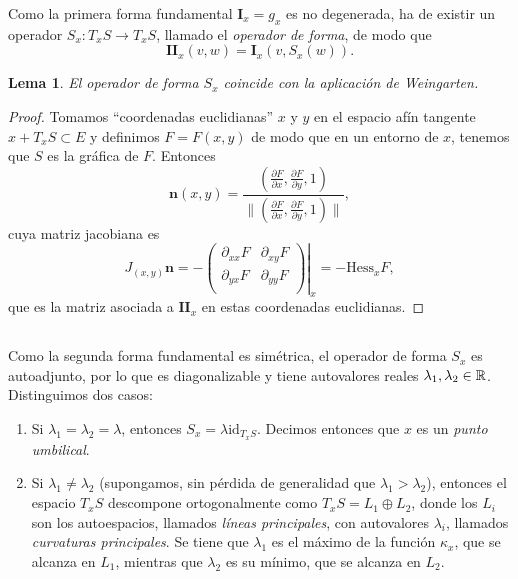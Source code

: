 \documentclass[11pt,a4paper]{amsbook}
\newtheorem{lemma}[subsection]{Lema}
\theoremstyle{remark} \newtheorem{rmk}[subsection]{Observación}
\theoremstyle{definition} \newtheorem{defn}[subsection]{Definición}
\theoremstyle{definition} \newtheorem{ex}[subsection]{Ejemplo}
\theoremstyle{definition} \newtheorem{ej}[subsection]{Ejercicio}
\begin{document}
Como la primera forma fundamental $\mathbf{I}_x=g_x$ es no degenerada, ha de existir un operador $S_x:T_xS \rightarrow T_xS$, llamado el \emph{operador de forma}, de modo que
\begin{equation*}
\mathbf{II}_x(v,w) = \mathbf{I}_x(v,S_x(w)).
\end{equation*}

\begin{lemma}
El operador de forma $S_x$ coincide con la aplicación de Weingarten.
\end{lemma}

\begin{proof}
  Tomamos ``coordenadas euclidianas'' $x$ y $y$ en el espacio afín tangente $x+T_x S \subset E$ y definimos $F=F(x,y)$ de modo que en un entorno de $x$, tenemos que $S$ es la gráfica de $F$. Entonces
  \begin{equation*}
\bm{n}(x,y) = \frac{(\frac{\partial F}{\partial x}, \frac{\partial F}{\partial y}, 1)}{\lVert (\frac{\partial F}{\partial x}, \frac{\partial F}{\partial y}, 1)\rVert},
  \end{equation*}
  cuya matriz jacobiana es
  \begin{equation*}
    J_{(x,y)} \bm{n}=
-\left. \begin{pmatrix}
\partial_{xx} F & \partial_{xy} F \\
\partial_{yx} F & \partial_{yy} F \\
\end{pmatrix} \right|_x = - \mathrm{Hess}_x F,
  \end{equation*}
  que es la matriz asociada a $\mathbf{II}_x$ en estas coordenadas euclidianas.
\end{proof}

\subsection{} Como la segunda forma fundamental es simétrica, el operador de forma $S_x$ es autoadjunto, por lo que es diagonalizable y tiene autovalores reales $\lambda_1,\lambda_2 \in \mathbb R$. Distinguimos dos casos:
\begin{enumerate}
\item Si $\lambda_1=\lambda_2=\lambda$, entonces $S_x = \lambda \mathrm{id}_{T_x S}$. Decimos entonces que $x$ es un \emph{punto umbilical}.
  \item Si $\lambda_1\neq \lambda_2$ (supongamos, sin pérdida de generalidad que $\lambda_1>\lambda_2$), entonces el espacio $T_xS$ descompone ortogonalmente como $T_xS=L_1\oplus L_2$, donde los $L_i$ son los autoespacios, llamados \emph{líneas principales}, con autovalores $\lambda_i$, llamados \emph{curvaturas principales}. Se tiene que $\lambda_1$ es el máximo de la función $\kappa_x$, que se alcanza en $L_1$, mientras que $\lambda_2$ es su mínimo, que se alcanza en $L_2$.
\end{enumerate}
\end{document}
